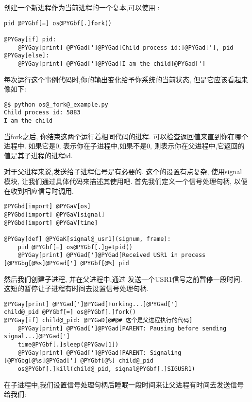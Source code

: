 \documentclass[letterpaper,10pt,english]{manual}
\begin{document}
创建一个新进程作为当前进程的一个复本,可以使用  :

\begin{Verbatim}[commandchars=@\[\]]
pid @PYGbf[=] os@PYGbf[.]fork()

@PYGay[if] pid:
    @PYGay[print] @PYGad[']@PYGad[Child process id:]@PYGad['], pid
@PYGay[else]:
    @PYGay[print] @PYGad[']@PYGad[I am the child]@PYGad[']
\end{Verbatim}

每次运行这个事例代码时,你的输出变化给予你系统的当前状态, 但是它应该看起来像如下:

\begin{Verbatim}[commandchars=@\[\]]
@$ python os@_fork@_example.py
Child process id: 5883
I am the child
\end{Verbatim}

当fork之后, 你结束这两个运行着相同代码的进程. 可以检查返回值来直到你在哪个进程中. 如果它是0, 表示你在子进程中,如果不是0, 则表示你在父进程中,它返回的值是其子进程的进程id.

对于父进程来说,发送给子进程信号是有必要的. 这个的设置有点复杂, 使用signal模块, 让我们通过具体代码来描述其使用吧. 首先我们定义一个信号处理句柄, 以便在收到相应信号时调用.

\begin{Verbatim}[commandchars=@\[\]]
@PYGbd[import] @PYGaV[os]
@PYGbd[import] @PYGaV[signal]
@PYGbd[import] @PYGaV[time]

@PYGay[def] @PYGaK[signal@_usr1](signum, frame):
    pid @PYGbf[=] os@PYGbf[.]getpid()
    @PYGay[print] @PYGad[']@PYGad[Received USR1 in process ]@PYGbg[@%s]@PYGad['] @PYGbf[@%] pid
\end{Verbatim}

然后我们创建子进程, 并在父进程中,通过  发送一个USR1信号之前暂停一段时间.这短的暂停让子进程有时间去设置信号处理句柄.

\begin{Verbatim}[commandchars=@\[\]]
@PYGay[print] @PYGad[']@PYGad[Forking...]@PYGad[']
child@_pid @PYGbf[=] os@PYGbf[.]fork()
@PYGay[if] child@_pid: @PYGaD[@#@# 这个是父进程执行的代码]
    @PYGay[print] @PYGad[']@PYGad[PARENT: Pausing before sending signal...]@PYGad[']
    time@PYGbf[.]sleep(@PYGaw[1])
    @PYGay[print] @PYGad[']@PYGad[PARENT: Signaling ]@PYGbg[@%s]@PYGad['] @PYGbf[@%] child@_pid
    os@PYGbf[.]kill(child@_pid, signal@PYGbf[.]SIGUSR1)
\end{Verbatim}

在子进程中,我们设置信号处理句柄后睡眠一段时间来让父进程有时间去发送信号给我们:
\end{document}
